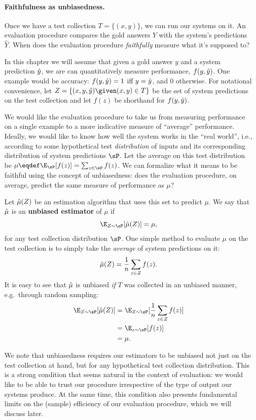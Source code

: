 \paragraph{Faithfulness as unbiasedness.}
Once we have a test collection $T = \{(x, y)\}$, we can run our systems on it.
An evaluation procedure compares the gold answers $Y$ with the system's predictions $\hat{Y}$.
When does the evaluation procedure \textit{faithfully} measure what it's supposed to?

In this chapter we will assume that given a gold answer $y$ and a system prediction $\hat{y}$, we are can quantitatively measure performance, $f(y, \hat{y})$.
One example would be accuracy: $f(y, \hat{y}) = 1$ iff $y = \hat{y}$, and $0$ otherwise.
For notational convenience, let $Z = \{(x, y, \yh) \given (x, y) \in T\}$ be the set of system predictions on the test collection and let $f(z)$ be shorthand for $f(y, \hat{y})$.

We would like the evaluation procedure to take us from measuring performance on a single example to a more indicative measure of ``average'' performance.
Ideally, we would like to know how well the system works in the ``real world'', i.e., according to some hypothetical test \textit{distribution} of inputs and its corresponding distribution of system predictions $\sP$.
Let the average on this test distribution be $\mu \eqdef \E_{\sP}[f(z)] = \sum_{z \in \sP} f(z)$.
We can formalize what it means to be faithful using the concept of unbiasedness: does the evaluation procedure, on average, predict the same measure of performance as $\mu$?

Let $\hat{\mu}(Z)$ be an estimation algorithm that uses this set to predict $\mu$.
We say that $\hat{\mu}$ is an \textbf{unbiased estimator} of $\mu$ if
\[
\E_{Z\sim \sP}[\muh(Z)] = \mu,
\]
for any test collection distribution $\sP$. 
One simple method to evaluate $\mu$ on the test collection is to simply take the \textit{average} of system predictions on it:
\[
\hat{\mu}(Z) = \frac{1}{n} \sum_{z \in Z} f(z).
\]
It is easy to see that $\hat{\mu}$ is unbiased \textit{if} $T$ was collected in an unbiased manner, e.g.\ through random sampling:
\begin{align*}
  \E_{Z \sim \sP}[\muh(Z)] 
    &= \E_{Z \sim \sP}[\frac{1}{n} \sum_{z \in Z} f(z)] \\
    &= \E_{z \sim \sP}[f(z)] \\
    &= \mu.
\end{align*}

We note that unbiasedness requires our estimators to be unbiased not just on the test collection at hand, but for any hypothetical test collection distribution.
This is a strong condition that seems natural in the context of evaluation: we would like to be able to trust our procedure irrespective of the type of output our systems produce.
At the same time, this condition also presents fundamental limits on the (sample) efficiency of our evaluation procedure, which we will discuss later.

